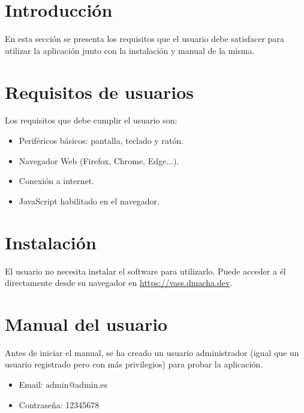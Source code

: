 
\section{Introducción}

En esta sección se presenta los requisitos que el usuario debe satisfacer para
utilizar la aplicación junto con la instalación y manual de la misma.

\section{Requisitos de usuarios}

Los requisitos que debe cumplir el usuario son:
\begin{itemize}
    \item Periféricos básicos: pantalla, teclado y ratón.
    \item Navegador Web (Firefox, Chrome, Edge...).
    \item Conexión a internet.
    \item JavaScript habilitado en el navegador.
\end{itemize}

\section{Instalación}

El usuario no necesita instalar el software para utilizarlo. Puede acceder a él
directamente desde su navegador en \url{https://vass.dmacha.dev}.

\section{Manual del usuario}

Antes de iniciar el manual, se ha creado un usuario administrador (igual que un
usuario registrado pero con más privilegios) para probar la aplicación.

\begin{tcolorbox}[colback=violet!5!white,colframe=violet!75!black,fontupper=\footnotesize,title=Credenciales administrador]
    \begin{itemize}
        \item Email: admin@admin.es
        \item Contraseña: 12345678
    \end{itemize}
\end{tcolorbox}

